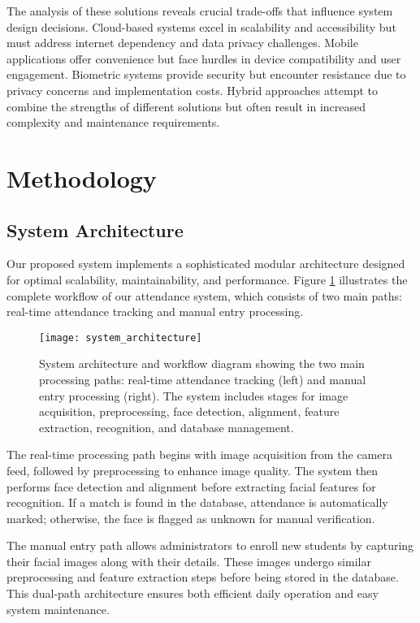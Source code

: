 \documentclass[conference]{IEEEtran}
\begin{document}
The analysis of these solutions reveals crucial trade-offs that influence system design decisions. Cloud-based systems excel in scalability and accessibility but must address internet dependency and data privacy challenges. Mobile applications offer convenience but face hurdles in device compatibility and user engagement. Biometric systems provide security but encounter resistance due to privacy concerns and implementation costs. Hybrid approaches attempt to combine the strengths of different solutions but often result in increased complexity and maintenance requirements.

\section{Methodology}

\subsection{System Architecture}
Our proposed system implements a sophisticated modular architecture designed for optimal scalability, maintainability, and performance. Figure \ref{fig:system_architecture} illustrates the complete workflow of our attendance system, which consists of two main paths: real-time attendance tracking and manual entry processing.

\begin{figure}[htbp]
\centering
\texttt{[image: system\_architecture]}
\caption{System architecture and workflow diagram showing the two main processing paths: real-time attendance tracking (left) and manual entry processing (right). The system includes stages for image acquisition, preprocessing, face detection, alignment, feature extraction, recognition, and database management.}
\label{fig:system_architecture}
\end{figure}

The real-time processing path begins with image acquisition from the camera feed, followed by preprocessing to enhance image quality. The system then performs face detection and alignment before extracting facial features for recognition. If a match is found in the database, attendance is automatically marked; otherwise, the face is flagged as unknown for manual verification.

The manual entry path allows administrators to enroll new students by capturing their facial images along with their details. These images undergo similar preprocessing and feature extraction steps before being stored in the database. This dual-path architecture ensures both efficient daily operation and easy system maintenance.
\end{document}
